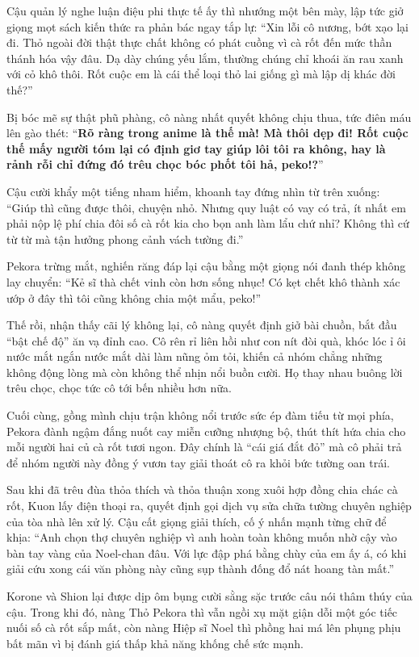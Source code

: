 \documentclass[../main.tex]{subfiles}
\begin{document}
Cậu quản lý nghe luận điệu phi thực tế ấy thì nhướng một bên mày, lập tức giở giọng mọt sách kiến thức ra phản bác ngay tắp lự: ``Xin lỗi cô nương, bớt xạo lại đi. Thỏ ngoài đời thật thực chất không có phát cuồng vì cà rốt đến mức thần thánh hóa vậy đâu. Dạ dày chúng yếu lắm, thường chúng chỉ khoái ăn rau xanh với cỏ khô thôi. Rốt cuộc em là cái thể loại thỏ lai giống gì mà lập dị khác đời thế?''

Bị bóc mẽ sự thật phũ phàng, cô nàng nhất quyết không chịu thua, tức điên máu lên gào thét: ``\textbf{Rõ ràng trong anime là thế mà! Mà thôi dẹp đi! Rốt cuộc thế mấy người tóm lại có định giơ tay giúp lôi tôi ra không, hay là rảnh rỗi chỉ đứng đó trêu chọc bóc phốt tôi hả, peko!?}''

Cậu cười khẩy một tiếng nham hiểm, khoanh tay đứng nhìn từ trên xuống: ``Giúp thì cũng được thôi, chuyện nhỏ. Nhưng quy luật có vay có trả, ít nhất em phải nộp lệ phí chia đôi số cà rốt kia cho bọn anh làm lẩu chứ nhỉ? Không thì cứ từ từ mà tận hưởng phong cảnh vách tường đi.''

Pekora trừng mắt, nghiến răng đáp lại cậu bằng một giọng nói đanh thép không lay chuyển: ``Kẻ sĩ thà chết vinh còn hơn sống nhục! Có kẹt chết khô thành xác ướp ở đây thì tôi cũng không chia một mẩu, peko!''

Thế rồi, nhận thấy cãi lý không lại, cô nàng quyết định giở bài chuồn, bắt đầu ``bật chế độ'' ăn vạ đỉnh cao. Cô rên rỉ liên hồi như con nít đòi quà, khóc lóc ỉ ôi nước mắt ngắn nước mắt dài làm nũng ỏm tỏi, khiến cả nhóm chẳng những không động lòng mà còn không thể nhịn nổi buồn cười. Họ thay nhau buông lời trêu chọc, chọc tức cô tới bến nhiều hơn nữa.

Cuối cùng, gồng mình chịu trận không nổi trước sức ép đàm tiếu từ mọi phía, Pekora đành ngậm đắng nuốt cay miễn cưỡng nhượng bộ, thút thít hứa chia cho mỗi người hai củ cà rốt tươi ngon. Đây chính là ``cái giá đắt đỏ'' mà cô phải trả để nhóm người này đồng ý vươn tay giải thoát cô ra khỏi bức tường oan trái.

Sau khi đã trêu đùa thỏa thích và thỏa thuận xong xuôi hợp đồng chia chác cà rốt, Kuon lấy điện thoại ra, quyết định gọi dịch vụ sửa chữa tường chuyên nghiệp của tòa nhà lên xử lý. Cậu cất giọng giải thích, cố ý nhấn mạnh từng chữ để khịa: ``Anh chọn thợ chuyên nghiệp vì anh hoàn toàn không muốn nhờ cậy vào bàn tay vàng của Noel-chan đâu. Với lực đập phá bằng chùy của em ấy á, có khi giải cứu xong cái văn phòng này cũng sụp thành đống đổ nát hoang tàn mất.''

Korone và Shion lại được dịp ôm bụng cười sằng sặc trước câu nói thâm thúy của cậu. Trong khi đó, nàng Thỏ Pekora thì vẫn ngồi xụ mặt giận dỗi một góc tiếc nuối số cà rốt sắp mất, còn nàng Hiệp sĩ Noel thì phồng hai má lên phụng phịu bất mãn vì bị đánh giá thấp khả năng khống chế sức mạnh.
\end{document}
